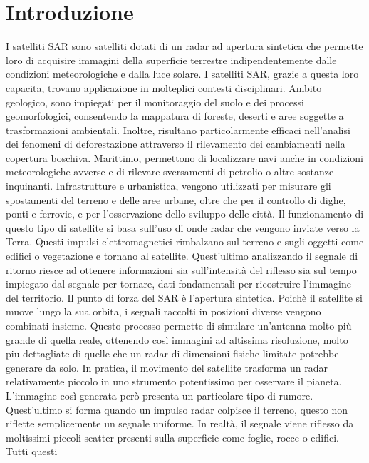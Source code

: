 
\chapter{Introduzione}

I satelliti SAR sono satelliti dotati di un radar ad apertura sintetica che permette
loro di acquisire immagini della superficie terrestre indipendentemente dalle 
condizioni meteorologiche e dalla luce solare. I satelliti SAR, grazie a questa loro 
capacita, trovano applicazione in molteplici contesti disciplinari. Ambito geologico, 
sono impiegati per il monitoraggio del suolo e dei processi 
geomorfologici, consentendo la mappatura di foreste, deserti e aree soggette a 
trasformazioni ambientali. Inoltre, risultano particolarmente efficaci nell’analisi 
dei fenomeni di deforestazione attraverso il rilevamento dei cambiamenti nella 
copertura boschiva. Marittimo, permettono di localizzare navi anche in condizioni 
meteorologiche avverse e di rilevare sversamenti di petrolio o altre sostanze 
inquinanti. Infrastrutture e urbanistica, vengono utilizzati per misurare gli 
spostamenti del terreno e delle aree urbane, oltre che per il controllo di dighe, 
ponti e ferrovie, e per l’osservazione dello sviluppo delle città. Il funzionamento 
di questo tipo di satellite si basa sull'uso di  onde radar che vengono inviate verso la Terra. 
Questi impulsi elettromagnetici rimbalzano sul terreno e sugli 
oggetti come edifici o vegetazione e tornano al satellite. Quest'ultimo analizzando il segnale di 
ritorno riesce ad ottenere informazioni sia sull'intensità del riflesso sia sul tempo impiegato 
dal segnale per tornare, dati fondamentali per ricostruire l'immagine del territorio. Il punto 
di forza del SAR è l'apertura sintetica. Poichè il satellite si muove lungo la sua orbita, i 
segnali raccolti in posizioni diverse vengono combinati insieme. Questo processo permette di 
simulare un'antenna molto più grande di quella reale, ottenendo così immagini ad altissima 
risoluzione, molto piu dettagliate di quelle che un radar di dimensioni fisiche limitate potrebbe 
generare da solo. In pratica, il movimento del satellite trasforma un radar relativamente piccolo 
in uno strumento potentissimo per osservare il pianeta. L'immagine così generata però presenta un 
particolare tipo di rumore. Quest'ultimo si forma quando un impulso radar colpisce il terreno, 
questo non riflette semplicemente un segnale uniforme. In realtà, il segnale viene riflesso da 
moltissimi piccoli scatter presenti sulla superficie come foglie, rocce o edifici. Tutti questi 
